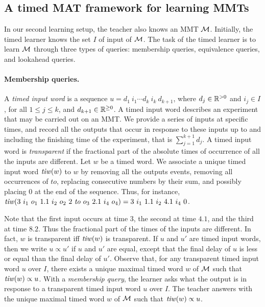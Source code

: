 \subsection{A timed MAT framework for learning MMTs}
In our second learning setup, the teacher also knows an MMT ${\cal M}$.
Initially, the timed learner knows the set $I$ of input of ${\cal M}$.
The task of the timed learner is to learn ${\cal M}$ through three types of queries: membership queries, equivalence queries,
and lookahead queries.

\paragraph{Membership queries.}
A \emph{timed input word} is a sequence
$u = d_1 ~ i_1 \cdots d_k ~ i_k ~ d_{k+1}$, where $d_j \in {\mathbb R}^{> 0}$ and $i_j \in I$, for all $1 \leq j \leq k$,
and $d_{k+1} \in {\mathbb R}^{\geq 0}$.
A timed input word describes an experiment that may be carried out on an MMT. We provide a series of inputs at specific times, and record all the outputs that occur in response to these inputs up to and including the finishing time of the experiment, that is $\sum_{j=1}^{k+1} d_j$.
A timed input word is \emph{transparent} if the fractional part of the absolute times of occurrence of
all the inputs are different.
Let $w$ be a timed word.
We associate a unique timed input word $\mathit{tiw}(w)$ to $w$ by 
removing all the outputs events, 
removing all occurrences of $\mathit{to}$, 
replacing consecutive numbers by their sum, 
and possibly placing $0$ at the end of the sequence.
Thus, for instance,
$\mathit{tiw} (3 ~ i_1 ~ o_1 ~ 1.1 ~ i_2 ~ o_2 ~ 2 ~ \mathit{to} ~ o_3 ~ 2.1 ~ i_4 ~ o_4) = 
3 ~ i_1 ~ 1.1 ~ i_2 ~ 4.1 ~ i_4 ~ 0$.

\iflong
Note that the first input occurs at time $3$, the second at time $4.1$, and the third at time $8.2$.
Thus the fractional part of the times of the inputs are different. In fact, $w$ is transparent iff $\mathit{tiw}(w)$ is transparent.
\fi
%
If $u$ and $u'$ are timed input words, then we write $u \propto u'$ if $u$ and $u'$ are equal, except that the final delay of $u$ is less or equal than the final delay of $u'$. Observe that,
for any transparent timed input word $u$ over $I$, 
there exists a unique maximal timed word $w$ of ${\cal M}$ such that $\mathit{tiw}(w) \propto u$.
With a \emph{membership query}, the learner asks what the output is in response to a transparent timed input word $u$ over $I$. 
The teacher answers with the unique maximal timed word $w$ of ${\cal M}$ such that $\mathit{tiw}(w) \propto u$.

